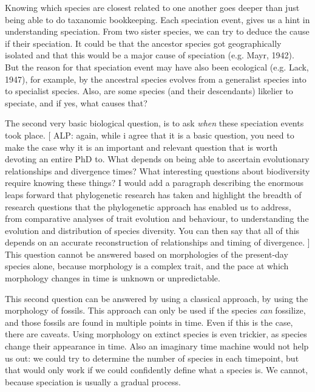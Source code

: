 Knowing which species are closest related to
one another goes deeper than just
being able to do taxanomic bookkeeping. Each
speciation event, gives us a hint in understanding speciation.
From two sister species, we can try to deduce the cause
if their speciation. It could be that the ancestor species
got geographically isolated and that this would be a major
cause of speciation (e.g. Mayr, 1942). But the reason for
that speciation event may have also been ecological (e.g. Lack, 1947),
for example, by the ancestral species evolves from a generalist
species into to specialist species. Also, are some species (and their
descendants) likelier to speciate, and if yes, what causes that?

The second very basic biological question, is to 
ask \emph{when} these speciation events took place.
[
  ALP:
  again, while i agree that it is a basic question, 
  you need to make the case why it is an important and relevant question 
  that is worth devoting an entire PhD to. 
  What depends on being able to ascertain 
  evolutionary relationships and divergence times? 
  What interesting questions about biodiversity require knowing these things?
  I would add a paragraph describing the enormous leaps 
  forward that phylogenetic research has taken and highlight 
  the breadth of research questions that the phylogenetic approach 
  has enabled us to address, from comparative analyses 
  of trait evolution and behaviour, to understanding 
  the evolution and distribution of species diversity. 
  You can then say that all of this depends on an accurate reconstruction 
  of relationships and timing of divergence.
]
This question cannot be answered based on morphologies of the present-day
species alone, because morphology is a complex trait, and the pace at
which morphology changes in time is unknown or unpredictable.

This second question can be answered by
using a classical approach, 
by using the morphology of fossils.
This approach can only be used if the species \emph{can} fossilize,
and those fossils are found in multiple points in time.
Even if this is the case, there are caveats. Using morphology on
extinct species is even trickier, as species change their appearance in time.
Also an imaginary time machine would not help us out:
we could try to determine the number of species in each timepoint,
but that would only work if we could confidently define what a
species is. We cannot, because speciation is usually a gradual process.


